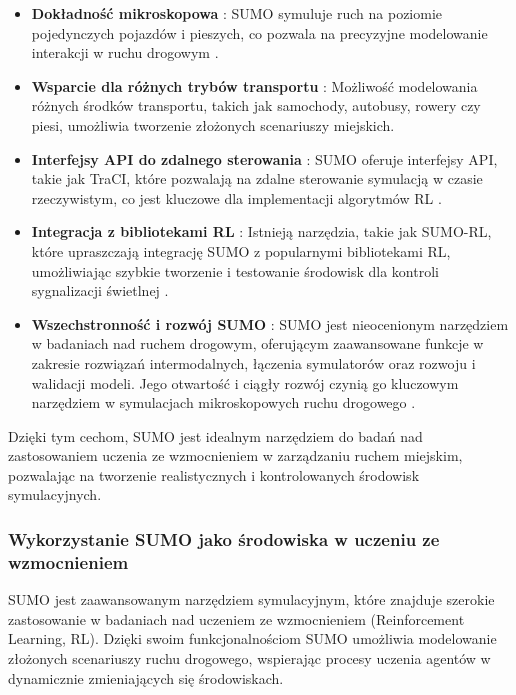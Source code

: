 \documentclass[12pt, a4paper]{article} %
\begin{document}
    \begin{itemize}
        \item \textbf{Dokładność mikroskopowa}
        : SUMO symuluje ruch na poziomie pojedynczych pojazdów i pieszych, co pozwala na precyzyjne modelowanie
        interakcji w ruchu drogowym \cite{sumo_docs}.
        \item \textbf{Wsparcie dla różnych trybów transportu}
        : Możliwość modelowania różnych środków transportu, takich jak samochody, autobusy, rowery czy piesi, umożliwia
        tworzenie złożonych scenariuszy miejskich.
        \item \textbf{Interfejsy API do zdalnego sterowania}
        : SUMO oferuje interfejsy API, takie jak TraCI, które pozwalają na zdalne sterowanie symulacją w czasie
        rzeczywistym, co jest kluczowe dla implementacji algorytmów RL \cite{sumo_docs}.
        \item \textbf{Integracja z bibliotekami RL}
        : Istnieją narzędzia, takie jak SUMO-RL, które upraszczają integrację SUMO z popularnymi bibliotekami RL,
        umożliwiając szybkie tworzenie i testowanie środowisk dla kontroli sygnalizacji świetlnej \cite{sumo_rl}.
        \item \textbf{Wszechstronność i rozwój SUMO}
        : SUMO jest nieocenionym narzędziem w badaniach nad ruchem drogowym, oferującym zaawansowane funkcje w zakresie
        rozwiązań intermodalnych, łączenia symulatorów oraz rozwoju i walidacji modeli. Jego otwartość i ciągły rozwój
        czynią go kluczowym narzędziem w symulacjach mikroskopowych ruchu drogowego \cite{Lopez2018}.
    \end{itemize}

    Dzięki tym cechom, SUMO jest idealnym narzędziem do badań nad zastosowaniem uczenia ze wzmocnieniem w zarządzaniu
    ruchem miejskim, pozwalając na tworzenie realistycznych i kontrolowanych środowisk symulacyjnych.

    \subsubsection{Wykorzystanie SUMO jako środowiska w uczeniu ze wzmocnieniem}

    SUMO jest zaawansowanym narzędziem symulacyjnym, które znajduje szerokie zastosowanie
    w badaniach nad uczeniem ze wzmocnieniem (Reinforcement Learning, RL). Dzięki swoim funkcjonalnościom SUMO umożliwia
    modelowanie złożonych scenariuszy ruchu drogowego, wspierając procesy uczenia agentów w dynamicznie zmieniających
    się środowiskach.
\end{document}
